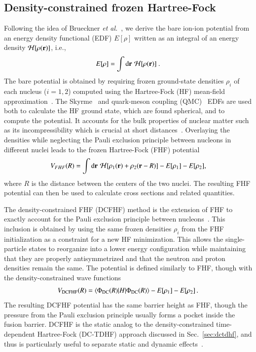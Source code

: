 \subsection{Density-constrained frozen Hartree-Fock}\label{sec:dcfhf}
Following the idea of Brueckner \textit{et al.}~\protect\citep{brueckner1968}, we derive the bare ion-ion potential from an energy density functional (EDF)  $E[\rho]$
written as an integral of an energy density ${\mathcal{H}}[\rho({\bf r})]$, i.e.,
\begin{equation}
E[\rho]=\int {\mbox d}{\bf r} \,\, {\mathcal{H}}[\rho({\bf r})]~.
\end{equation}
The bare potential is obtained by requiring frozen ground-state densities $\rho_{i}$ of each nucleus ($i=1,2$) computed using the Hartree-Fock (HF) mean-field approximation~\protect\citep{hartree1928,fock1930}.
The Skyrme~\protect\citep{skyrme1956} and quark-meson coupling (QMC)~\protect\citep{stone2016} EDFs are used both to calculate the HF ground state, which are found spherical, and to compute the potential.
It accounts for the bulk properties of nuclear matter such as its incompressibility which is crucial at short distances~\protect\citep{brueckner1968,misicu2006,hossain2015}.
Overlaying the densities while neglecting the Pauli exclusion principle between nucleons in different nuclei
leads to the frozen Hartree-Fock (FHF) potential~\protect\citep{washiyama2008,simenel2008,simenel2012}
\begin{equation}
V_{FHF}(R)=\int {\mbox d}{\bf r} \,\, {\mathcal{H}}[\rho_1({\bf r})+\rho_2({\bf r}-R)] - E[\rho_1] -E[\rho_2],
\label{eq:frozen}
\end{equation}
where $R$ is the distance between the centers of the two nuclei.
The resulting FHF potential can then be used to calculate cross sections and related quantities.

The density-constrained FHF (DCFHF) method is the extension of FHF to exactly account for the Pauli exclusion principle between nucleons~\protect\citep{simenel2017}.
This inclusion is obtained by using the same frozen densities $\rho_{i}$ from the FHF initialization as a constraint for a new HF minimization.
This allows the single-particle states to reorganize into a lower energy configuration while maintaining that they are properly antisymmetrized and that the neutron and proton densities remain the same.
The potential is defined similarly to FHF, though with the density-constrained wave functions~\protect\citep{simenel2017}
\begin{equation}
V_{\mathrm{DCFHF}}(R)=\langle\Phi_{\mathrm{DC}}(R) | H | \Phi_{\mathrm{DC}}(R) \rangle-E[\rho_1]-E[\rho_2]\,.
\end{equation}
The resulting DCFHF potential has the same barrier height as FHF, though the pressure from the Pauli exclusion principle usually forms a pocket inside the fusion barrier.
DCFHF is the static analog to the density-constrained time-dependent Hartree-Fock (DC-TDHF) approach discussed in Sec.~\ref{sec:dctdhf}, and thus is particularly useful to separate static and dynamic effects~\protect\citep{vophuoc2016}.

